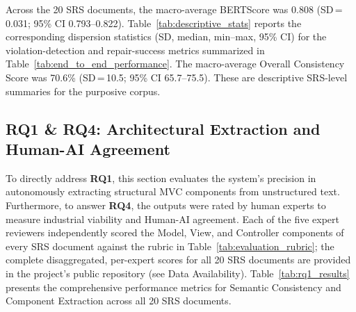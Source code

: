 Across the 20 SRS documents, the macro-average BERTScore was 0.808 (SD\,=\,0.031; 95\% CI 0.793--0.822). Table~\ref{tab:descriptive_stats} reports the corresponding dispersion statistics (SD, median, min--max, 95\% CI) for the violation-detection and repair-success metrics summarized in Table~\ref{tab:end_to_end_performance}. The macro-average Overall Consistency Score was 70.6\% (SD\,=\,10.5; 95\% CI 65.7--75.5). These are descriptive SRS-level summaries for the purposive corpus.

\subsection{RQ1 \& RQ4: Architectural Extraction and Human-AI Agreement}

To directly address \textbf{RQ1}, this section evaluates the system's precision in autonomously extracting structural MVC components from unstructured text. Furthermore, to answer \textbf{RQ4}, the outputs were rated by human experts to measure industrial viability and Human-AI agreement. Each of the five expert reviewers independently scored the Model, View, and Controller components of every SRS document against the rubric in Table~\ref{tab:evaluation_rubric}; the complete disaggregated, per-expert scores for all 20 SRS documents are provided in the project's public repository (see Data Availability). Table~\ref{tab:rq1_results} presents the comprehensive performance metrics for Semantic Consistency and Component Extraction across all 20 SRS documents. 

